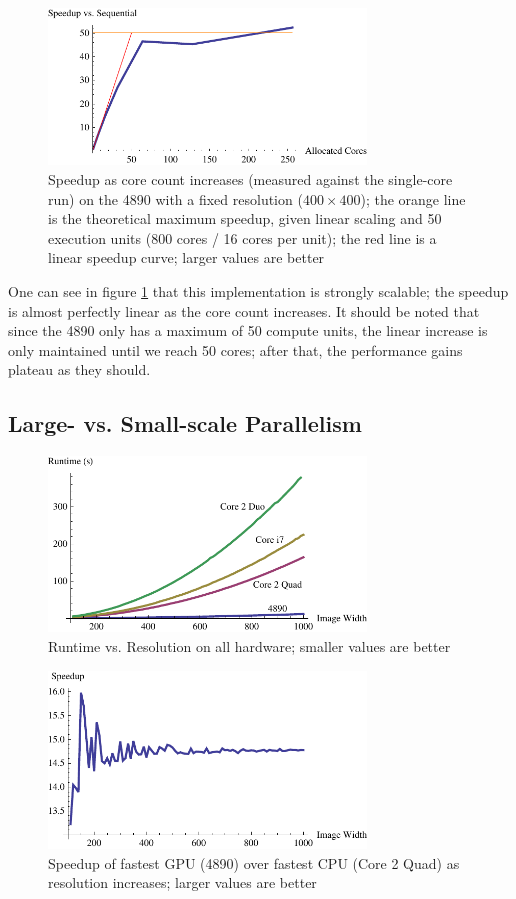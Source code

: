 \documentclass{acmsiggraph}
\begin{document}
\begin{figure}
    \includegraphics[width=84.5mm]{strongPlotTwo.pdf}
    \caption{Speedup as core count increases (measured against the single-core run) on the 4890 with a fixed resolution ($400\times400$); the orange line is the theoretical maximum speedup, given linear scaling and 50 execution units (800 cores / 16 cores per unit); the red line is a linear speedup curve; larger values are better}
    \label{fig:strongPlotTwo}
\end{figure}

One can see in figure \ref{fig:strongPlotTwo} that this implementation is strongly scalable; the speedup is almost perfectly linear as the core count increases. It should be noted that since the 4890 only has a maximum of 50 compute units, the linear increase is only maintained until we reach 50 cores; after that, the performance gains plateau as they should.

\subsection{Large- vs. Small-scale Parallelism}

\begin{figure}
    \includegraphics[width=84.5mm]{runtimePlot.pdf}
    \caption{Runtime vs. Resolution on all hardware; smaller values are better}
    \label{fig:runtimePlot}
\end{figure}

\begin{figure}
    \includegraphics[width=84.5mm]{speedupPlot.pdf}
    \caption{Speedup of fastest GPU (4890) over fastest CPU (Core 2 Quad) as resolution increases; larger values are better}
    \label{fig:speedupPlot}
\end{figure}
\end{document}
